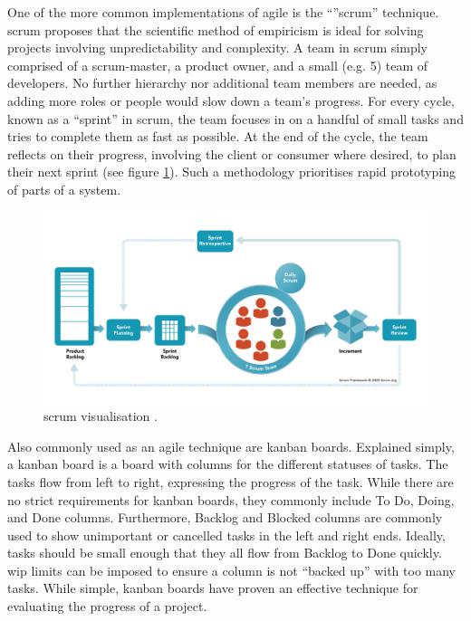 \documentclass[11pt]{article}
\begin{document}
One of the more common implementations of agile is the ``''\Gls{scrum}'' technique. \Gls{scrum} proposes that the scientific method of empiricism is ideal for solving projects involving unpredictability and complexity. A team in \Gls{scrum} simply comprised of a \Gls{scrum-master}, a product owner, and a small (e.g. 5) team of developers. No further hierarchy nor additional team members are needed, as adding more roles or people would slow down a team's progress. For every cycle, known as a ``\gls{sprint}'' in \Gls{scrum}, the team focuses in on a handful of small tasks and tries to complete them as fast as possible. At the end of the cycle, the team reflects on their progress, involving the client or consumer where desired, to plan their next \gls{sprint} (see figure \ref{fig:scrum}). Such a methodology prioritises rapid prototyping of parts of a system.

\begin{figure}[b!]
    \centering
    \includegraphics[width=\textwidth]{figures/scrum-framework.png}
    \caption{\Gls{scrum} visualisation \cite{what-is-scrum}.}
    \label{fig:scrum}
\end{figure}

Also commonly used as an \gls{agile} technique are \Gls{kanban} boards. Explained simply, a \Gls{kanban} board is a board with columns for the different statuses of tasks. The tasks flow from left to right, expressing the progress of the task. While there are no strict requirements for \Gls{kanban} boards, they commonly include To Do, Doing, and Done columns. Furthermore, Backlog and Blocked columns are commonly used to show unimportant or cancelled tasks in the left and right ends. Ideally, tasks should be small enough that they all flow from Backlog to Done quickly. \acrfull{wip} limits can be imposed to ensure a column is not ``backed up'' with too many tasks. While simple, \Gls{kanban} boards have proven an effective technique for evaluating the progress of a project.
\end{document}
